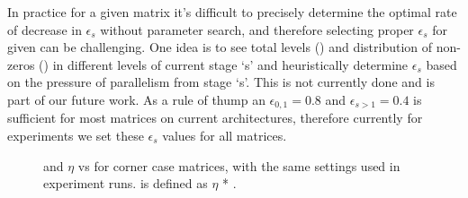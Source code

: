 In practice for a given matrix it's difficult to precisely determine the optimal rate of decrease in $\epsilon_s$ without parameter search, and therefore selecting proper $\epsilon_s$ for given \nthreads can be challenging. One idea is to see total levels (\totalLvl) and distribution of non-zeros (\nnz) in different levels of current stage `s' and heuristically determine $\epsilon_s$ based on the pressure of parallelism from stage `s'. This is not currently done and is part of our future work. As a rule of thump an $\epsilon_{0,1} = 0.8$ and $\epsilon_{s>1} = 0.4$ is sufficient for most matrices on current architectures, therefore currently for experiments we set these $\epsilon_s$ values for all matrices.

\begin{figure}[tbhp]
	\centering
	\caption{\threadEff and $\eta$ vs \nthreads for corner case matrices, with the same settings used in experiment runs. \threadEff is defined as $\eta$ * \nthreads.}
	\label{fig:corner_cases_param}
\end{figure}
